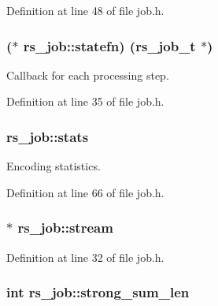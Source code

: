 Definition at line 48 of file job.\+h.

\hypertarget{structrs__job_aa789990d61f5eadc6a26aeedf4bec765}{}
\subsubsection[{statefn}]{($\ast$ rs\+\_\+job\+::statefn) ({\bf rs\+\_\+job\+\_\+t} $\ast$)}\label{structrs__job_aa789990d61f5eadc6a26aeedf4bec765}
Callback for each processing step. 

Definition at line 35 of file job.\+h.

\hypertarget{structrs__job_ae84dc982a6e97d457d2f5b841256210e}{}
\subsubsection[{stats}]{ rs\+\_\+job\+::stats}\label{structrs__job_ae84dc982a6e97d457d2f5b841256210e}
Encoding statistics. 

Definition at line 66 of file job.\+h.

\hypertarget{structrs__job_a881d6a21bd30b989f5f74a754bec6d8d}{}
\subsubsection[{stream}]{$\ast$ rs\+\_\+job\+::stream}\label{structrs__job_a881d6a21bd30b989f5f74a754bec6d8d}


Definition at line 32 of file job.\+h.

\hypertarget{structrs__job_a8eb87d0bd34c3acc2ff3c1545a730fa4}{}
\subsubsection[{strong\+\_\+sum\+\_\+len}]{\setlength{\rightskip}{0pt plus 5cm}int rs\+\_\+job\+::strong\+\_\+sum\+\_\+len}\label{structrs__job_a8eb87d0bd34c3acc2ff3c1545a730fa4}


